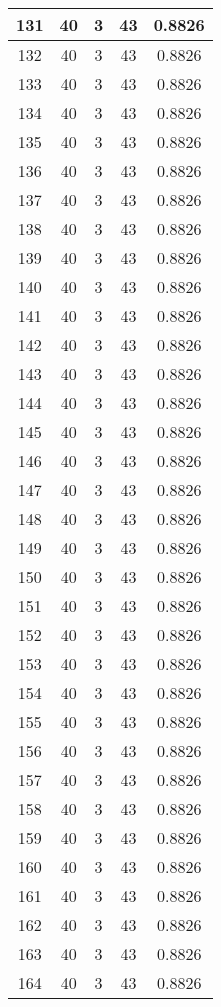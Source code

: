 \documentclass[letterpaper, 12pt]{article}
\begin{document}
\begin{longtable}{|c|c|c|c|c|}
\hline
131 & 40 & 3 & 43 & 0.8826 \\
\hline
132 & 40 & 3 & 43 & 0.8826 \\
\hline
133 & 40 & 3 & 43 & 0.8826 \\
\hline
134 & 40 & 3 & 43 & 0.8826 \\
\hline
135 & 40 & 3 & 43 & 0.8826 \\
\hline
136 & 40 & 3 & 43 & 0.8826 \\
\hline
137 & 40 & 3 & 43 & 0.8826 \\
\hline
138 & 40 & 3 & 43 & 0.8826 \\
\hline
139 & 40 & 3 & 43 & 0.8826 \\
\hline
140 & 40 & 3 & 43 & 0.8826 \\
\hline
141 & 40 & 3 & 43 & 0.8826 \\
\hline
142 & 40 & 3 & 43 & 0.8826 \\
\hline
143 & 40 & 3 & 43 & 0.8826 \\
\hline
144 & 40 & 3 & 43 & 0.8826 \\
\hline
145 & 40 & 3 & 43 & 0.8826 \\
\hline
146 & 40 & 3 & 43 & 0.8826 \\
\hline
147 & 40 & 3 & 43 & 0.8826 \\
\hline
148 & 40 & 3 & 43 & 0.8826 \\
\hline
149 & 40 & 3 & 43 & 0.8826 \\
\hline
150 & 40 & 3 & 43 & 0.8826 \\
\hline
151 & 40 & 3 & 43 & 0.8826 \\
\hline
152 & 40 & 3 & 43 & 0.8826 \\
\hline
153 & 40 & 3 & 43 & 0.8826 \\
\hline
154 & 40 & 3 & 43 & 0.8826 \\
\hline
155 & 40 & 3 & 43 & 0.8826 \\
\hline
156 & 40 & 3 & 43 & 0.8826 \\
\hline
157 & 40 & 3 & 43 & 0.8826 \\
\hline
158 & 40 & 3 & 43 & 0.8826 \\
\hline
159 & 40 & 3 & 43 & 0.8826 \\
\hline
160 & 40 & 3 & 43 & 0.8826 \\
\hline
161 & 40 & 3 & 43 & 0.8826 \\
\hline
162 & 40 & 3 & 43 & 0.8826 \\
\hline
163 & 40 & 3 & 43 & 0.8826 \\
\hline
164 & 40 & 3 & 43 & 0.8826 \\

\end{longtable}
\end{document}
